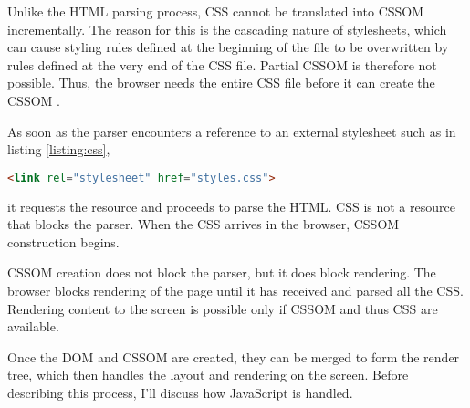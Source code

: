 
Unlike the HTML parsing process, CSS cannot be translated into CSSOM incrementally.
The reason for this is the cascading nature of stylesheets, which can cause styling rules defined at the beginning of the file to be overwritten by rules defined at the very end of the CSS file.
Partial CSSOM is therefore not possible.
Thus, the browser needs the entire CSS file before it can create the CSSOM \cite{2021MDNCRP}.



As soon as the parser encounters a reference to an external stylesheet such as in listing \ref{listing:css},

\begin{center}
\begin{lstlisting}[caption={Link to a CSS file from the main document}, label={listing:css}, language=html, numbers=none]
<link rel="stylesheet" href="styles.css">
\end{lstlisting}
\end{center}

it requests the resource and proceeds to parse the HTML.
CSS is not a resource that blocks the parser.
When the CSS arrives in the browser, CSSOM construction begins.




CSSOM creation does not block the parser, but it does block rendering.
The browser blocks rendering of the page until it has received and parsed all the CSS.
Rendering content to the screen is possible only if CSSOM and thus CSS are available. 



Once the DOM and CSSOM are created, they can be merged to form the render tree, which then handles the layout and rendering on the screen.
Before describing this process, I'll discuss how JavaScript is handled.



